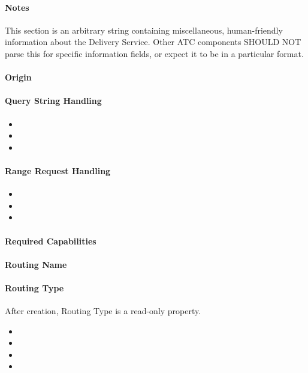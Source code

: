 \paragraph{Notes}
This section is an arbitrary string containing miscellaneous, human-friendly
information about the Delivery Service. Other ATC components SHOULD NOT parse
this for specific information fields, or expect it to be in a particular format.

\paragraph{Origin}

\paragraph{Query String Handling}

\begin{itemize}
	\item {}
	\item {}
	\item {}
\end{itemize}

\paragraph{Range Request Handling}
\begin{itemize}
	\item {}
	\item {}
	\item {}
\end{itemize}


\paragraph{Required Capabilities}

\paragraph{Routing Name}

\paragraph{Routing Type}
After creation, Routing Type is a read-only property.
\begin{itemize}
	\item {}
	\item {}
	\item {}
	\item {}
\end{itemize}

